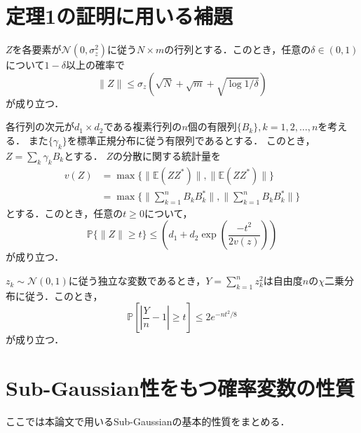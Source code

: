 \chapter{定理1の証明に用いる補題}

\begin{sub}
\label{Z_bound}
\cite{ITTN}
$Z$を各要素が$\mathcal{N}(0, \sigma_z^2)$に従う$N \times m$の行列とする．このとき，任意の$\delta \in(0, 1)$について$1-\delta$以上の確率で
\begin{equation*}
    \|Z\| \leq \sigma_z(\sqrt{N} + \sqrt{m} + \sqrt{\log{1/  \delta}} )
\end{equation*}
が成り立つ．
\end{sub}

\begin{sub}
\label{W_bound}
\cite{AITM}
各行列の次元が$d_1 \times d_2$である複素行列の$n$個の有限列$\{B_k\}, k=1, 2, \ldots, n$を考える．
また$\{\gamma_k\}$を標準正規分布に従う有限列であるとする．
このとき，$Z = \sum_k \gamma_k B_k$とする．
$Z$の分散に関する統計量を
\begin{align*}
    v(Z) &= \max \{ \|\mathbb{E}(ZZ^*)\| , \| \mathbb{E}(ZZ^*) \|\} \\
    &= \max \{ \| \sum_{k=1}^{n} B_kB_k^* \| , \| \sum_{k=1}^{n} B_kB_k^* \|\}
\end{align*}
とする．このとき，任意の$t \geq 0$について，
\begin{equation*}
    \mathbb{P}\{ \|Z\| \geq t\} \leq \left(d_1 + d_2 \exp{\left( \frac{-t^2}{2v(z)} \right)} \right)
\end{equation*}
が成り立つ．
\end{sub}

\begin{sub}
\label{chi^2_bound}
\cite{HDSA}
$z_k \sim \mathcal{N}(0, 1)$に従う独立な変数であるとき，$Y = \sum_{k=1}^{n}z_k^2$は自由度$n$の$\chi$二乗分布に従う．このとき，
\begin{equation*}
    \mathbb{P}\left[\left|\frac{Y}{n} -1 \right| \geq t \right] \leq 2e^{-nt^2/8}
\end{equation*}
が成り立つ．
\end{sub}

\chapter{Sub-Gaussian性をもつ確率変数の性質}
ここでは本論文で用いるSub-Gaussianの基本的性質をまとめる．


